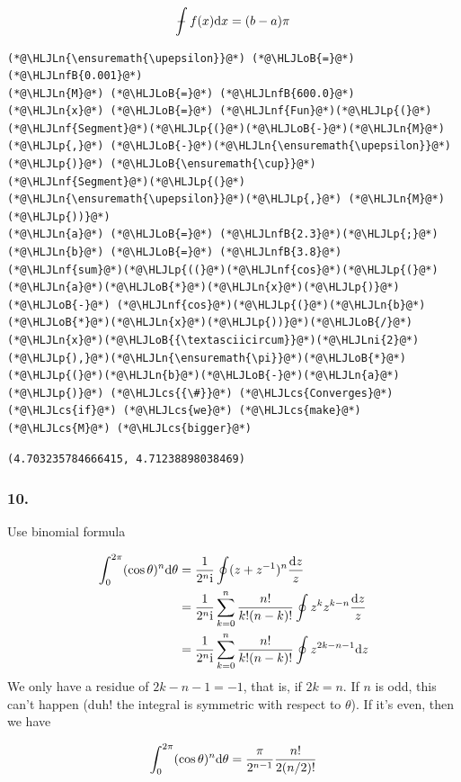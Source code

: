 \documentclass[12pt,a4paper]{article}
\newcommand{\HLJLn}[1]{#1}
\newcommand{\HLJLnf}[1]{\textcolor[RGB]{66,102,213}{#1}}
\newcommand{\HLJLnfB}[1]{\textcolor[RGB]{59,151,46}{#1}}
\newcommand{\HLJLni}[1]{\textcolor[RGB]{59,151,46}{#1}}
\newcommand{\HLJLoB}[1]{\textcolor[RGB]{102,102,102}{\textbf{#1}}}
\newcommand{\HLJLp}[1]{#1}
\newcommand{\HLJLcs}[1]{\textcolor[RGB]{153,153,119}{\textit{#1}}}
\def\D{ {\rm d} }
\def\I{ {\rm i} }
\def\upepsilon{\varepsilon}
\def\Xint#1{ \mathchoice
   {\XXint\displaystyle\textstyle{#1} }%
   {\XXint\textstyle\scriptstyle{#1} }%
   {\XXint\scriptstyle\scriptscriptstyle{#1} }%
   {\XXint\scriptscriptstyle\scriptscriptstyle{#1} }%
   \!\int}
\def\XXint#1#2#3{ {\setbox0=\hbox{$#1{#2#3}{\int}$}
     \vcenter{\hbox{$#2#3$}}\kern-.5\wd0} }
\def\dashint{\Xint-}
\def\dx{\D x}
\def\dz{\D z}
\begin{document}
\[
    \dashint f(x)\dx = (b-a)\pi
\]

\begin{lstlisting}
(*@\HLJLn{\ensuremath{\upepsilon}}@*) (*@\HLJLoB{=}@*)(*@\HLJLnfB{0.001}@*)
(*@\HLJLn{M}@*) (*@\HLJLoB{=}@*) (*@\HLJLnfB{600.0}@*)
(*@\HLJLn{x}@*) (*@\HLJLoB{=}@*) (*@\HLJLnf{Fun}@*)(*@\HLJLp{(}@*)(*@\HLJLnf{Segment}@*)(*@\HLJLp{(}@*)(*@\HLJLoB{-}@*)(*@\HLJLn{M}@*) (*@\HLJLp{,}@*) (*@\HLJLoB{-}@*)(*@\HLJLn{\ensuremath{\upepsilon}}@*)(*@\HLJLp{)}@*) (*@\HLJLoB{\ensuremath{\cup}}@*) (*@\HLJLnf{Segment}@*)(*@\HLJLp{(}@*)(*@\HLJLn{\ensuremath{\upepsilon}}@*)(*@\HLJLp{,}@*) (*@\HLJLn{M}@*)(*@\HLJLp{))}@*)
(*@\HLJLn{a}@*) (*@\HLJLoB{=}@*) (*@\HLJLnfB{2.3}@*)(*@\HLJLp{;}@*) (*@\HLJLn{b}@*) (*@\HLJLoB{=}@*) (*@\HLJLnfB{3.8}@*)
(*@\HLJLnf{sum}@*)(*@\HLJLp{((}@*)(*@\HLJLnf{cos}@*)(*@\HLJLp{(}@*)(*@\HLJLn{a}@*)(*@\HLJLoB{*}@*)(*@\HLJLn{x}@*)(*@\HLJLp{)}@*) (*@\HLJLoB{-}@*) (*@\HLJLnf{cos}@*)(*@\HLJLp{(}@*)(*@\HLJLn{b}@*)(*@\HLJLoB{*}@*)(*@\HLJLn{x}@*)(*@\HLJLp{))}@*)(*@\HLJLoB{/}@*)(*@\HLJLn{x}@*)(*@\HLJLoB{{\textasciicircum}}@*)(*@\HLJLni{2}@*)(*@\HLJLp{),}@*)(*@\HLJLn{\ensuremath{\pi}}@*)(*@\HLJLoB{*}@*)(*@\HLJLp{(}@*)(*@\HLJLn{b}@*)(*@\HLJLoB{-}@*)(*@\HLJLn{a}@*)(*@\HLJLp{)}@*) (*@\HLJLcs{{\#}}@*) (*@\HLJLcs{Converges}@*) (*@\HLJLcs{if}@*) (*@\HLJLcs{we}@*) (*@\HLJLcs{make}@*) (*@\HLJLcs{M}@*) (*@\HLJLcs{bigger}@*)
\end{lstlisting}

\begin{lstlisting}
(4.703235784666415, 4.71238898038469)
\end{lstlisting}


\subsubsection{10.}
Use binomial formula


\begin{align*}
\int_0^{2 \pi} (\cos \theta)^n \D \theta &= {1 \over 2^n \I} \oint (z+z^{-1})^n {\dz \over z} \\
 &=  {1 \over 2^n \I} \sum_{k=0}^n {n! \over k! (n-k)!} \oint z^k z^{k-n} {\dz \over z} \\
 &=  {1 \over 2^n \I} \sum_{k=0}^n {n! \over k! (n-k)!} \oint z^{2k-n-1}\dz
\end{align*}
We only have a residue of $2k-n-1 = -1$, that is, if $2k = n$. If $n$ is odd, this can't happen  (duh! the integral is symmetric with respect to $\theta$). If it's even, then we have

\[
\int_0^{2 \pi} (\cos \theta)^n \D \theta =  {\pi \over 2^{n-1} }  {n! \over 2 (n/2)!} 
\]
\end{document}
